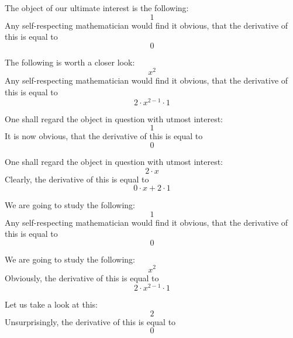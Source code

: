 \documentclass{article}
\begin{document}
The object of our ultimate interest is the following:
\begin{equation}
1 
\end{equation}
Any self-respecting mathematician would find it obvious, that the derivative of this is equal to
\begin{equation}
0 
\end{equation}

The following is worth a closer look:
\begin{equation}
x ^{2 } 
\end{equation}
Any self-respecting mathematician would find it obvious, that the derivative of this is equal to
\begin{equation}
2 \cdot x ^{2 - 1 } \cdot 1 
\end{equation}

One shall regard the object in question with utmost interest:
\begin{equation}
1 
\end{equation}
It is now obvious, that the derivative of this is equal to
\begin{equation}
0 
\end{equation}

One shall regard the object in question with utmost interest:
\begin{equation}
2 \cdot x 
\end{equation}
Clearly, the derivative of this is equal to
\begin{equation}
0 \cdot x + 2 \cdot 1 
\end{equation}

We are going to study the following:
\begin{equation}
1 
\end{equation}
Any self-respecting mathematician would find it obvious, that the derivative of this is equal to
\begin{equation}
0 
\end{equation}

We are going to study the following:
\begin{equation}
x ^{2 } 
\end{equation}
Obviously, the derivative of this is equal to
\begin{equation}
2 \cdot x ^{2 - 1 } \cdot 1 
\end{equation}

Let us take a look at this:
\begin{equation}
2 
\end{equation}
Unsurprisingly, the derivative of this is equal to
\begin{equation}
0 
\end{equation}
\end{document}

